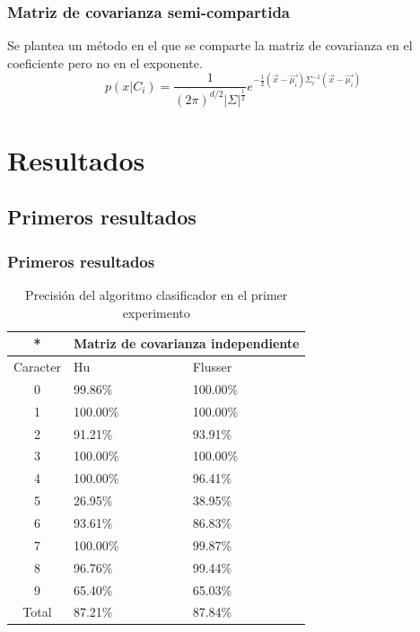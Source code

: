 \documentclass{beamer}
\begin{document}
	\begin{frame}
	\frametitle{Matriz de covarianza semi-compartida}
	Se plantea un método en el que se comparte la matriz de covarianza en el coeficiente pero no en el exponente.
	\begin{equation}\label{eq:semishared}
		p(x|C_i) = \frac{1}{(2\pi)^{d/2}|\Sigma|^\frac{1}{2}} e^{-\frac{1}{2}(\vec{x}-\vec{\mu_i})\Sigma_i^{-1}(\vec{x}-\vec{\mu_i})}
	\end{equation} 
	\end{frame}
	
	\section{Resultados}
	
	\subsection{Primeros resultados}
	\begin{frame}
	\frametitle{Primeros resultados}
	\begin{table}
	\centering
	\begin{tabular}{|c|p{3cm}|p{3cm}|}
		\hline
		* & \multicolumn{2}{|c|}{Matriz de covarianza independiente} \\
		\hline
		Caracter & Hu & Flusser \\
		\hline
		0 & 99.86\% & 100.00\% \\
		1 & 100.00\% & 100.00\% \\
		2 & 91.21\% & 93.91\% \\
		3 & 100.00\% & 100.00\% \\
		4 & 100.00\% & 96.41\% \\		
		5 & 26.95\% & 38.95\% \\ 
		6 & 93.61\% & 86.83\% \\
		7 & 100.00\% & 99.87\% \\
		8 & 96.76\% & 99.44\% \\
		9 & 65.40\% & 65.03\% \\
		\hline
		Total & 87.21\% & 87.84\% \\
		\hline
	\end{tabular}
	\caption{Precisión del algoritmo clasificador en el primer experimento}	
	\label{tb:exp1_1}
	\end{table}
	\end{frame}
	
\end{document}
